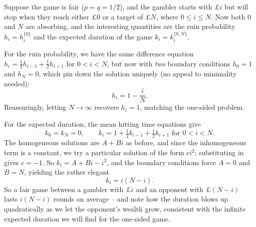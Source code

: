 \begin{example}
	Suppose the game is fair ($p = q = 1/2$), and the gambler starts with $\pounds i$ but will stop when they reach either $\pounds 0$ or a target of $\pounds N$, where $0 \leq i \leq N$. Now both 0 and $N$ are absorbing, and the interesting quantities are the ruin probability $h_i = h_i^{\{0\}}$ and the expected duration of the game $k_i = k_i^{\{0, N\}}$.

	\begin{center}
	\end{center}

	For the ruin probability, we have the same difference equation $h_i = \frac{1}{2}h_{i - 1} + \frac{1}{2}h_{i + 1}$ for $0 < i < N$, but now with \emph{two} boundary conditions $h_0 = 1$ and $h_N = 0$, which pin down the solution uniquely (no appeal to minimality needed):
	$$
	h_i = 1 - \frac{i}{N}.
	$$
	Reassuringly, letting $N \to \infty$ recovers $h_i = 1$, matching the one-sided problem.

	For the expected duration, the mean hitting time equations give
	$$
	k_0 = k_N = 0, \qquad k_i = 1 + \tfrac{1}{2}k_{i - 1} + \tfrac{1}{2}k_{i + 1} \text{ for } 0 < i < N.
	$$
	The homogeneous solutions are $A + Bi$ as before, and since the inhomogeneous term is a constant, we try a particular solution of the form $ci^2$; substituting in gives $c = -1$. So $k_i = A + Bi - i^2$, and the boundary conditions force $A = 0$ and $B = N$, yielding the rather elegant
	$$
	k_i = i(N - i).
	$$
	So a fair game between a gambler with $\pounds i$ and an opponent with $\pounds(N - i)$ lasts $i(N - i)$ rounds on average -- and note how the duration blows up quadratically as we let the opponent's wealth grow, consistent with the infinite expected duration we will find for the one-sided game.
\end{example}

